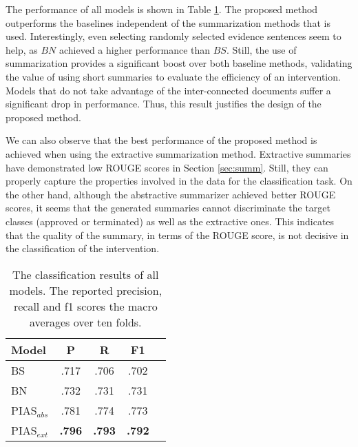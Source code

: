 \documentclass[11pt]{article}
\begin{document}
The performance of all models is shown in Table \ref{tab:main}. The proposed method outperforms the baselines independent of the summarization methods that is used. Interestingly, even selecting randomly selected  evidence sentences seem to help, as $BN$ achieved a higher performance than $BS$. Still, the use of summarization provides a significant boost over both baseline methods, validating the value of using short summaries to evaluate the efficiency of an intervention. Models that do not take advantage of the inter-connected documents suffer a significant drop in performance. Thus, this result justifies the design of the proposed method.

We can also observe that the best performance of the proposed method is achieved when using the extractive summarization method. Extractive summaries have demonstrated low ROUGE scores in Section \ref{sec:summ}. Still, they can properly capture the properties involved in the data for the classification task. On the other hand, although the abstractive summarizer achieved better ROUGE  scores, it seems that the generated summaries cannot discriminate the target classes (approved or terminated) as well as the extractive ones. This indicates that the quality of the summary, in terms of the ROUGE score, is not decisive in the classification of the intervention.

\begin{table}[htp]
\centering
\begin{tabular}{lcccc}
\hline
\textbf{Model} &\textbf{P} & \textbf{R} & \textbf{F1}\\
\hline
BS & .717 & .706 & .702 \\ 
BN & .732 & .731 & .731 \\ 
PIAS$_{abs}$ & .781 & .774 & .773 \\ 

PIAS$_{ext}$ & \textbf{.796} & \textbf{.793} & \textbf{.792}\\ 
\hline
\end{tabular}

\caption{The classification results of all models. The reported precision, recall and f1 scores the macro averages over ten folds.}
\label{tab:main}
\end{table}
\end{document}
